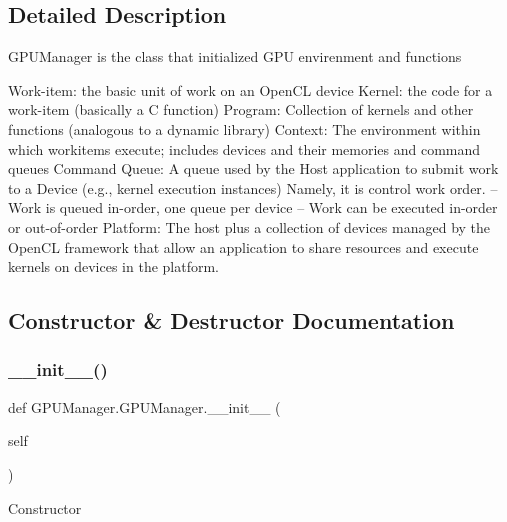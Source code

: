 \subsection{Detailed Description}
\begin{DoxyVerb}GPUManager is the class that initialized GPU envirenment and functions

Work-item: the basic unit of work on an OpenCL device
Kernel: the code for a work-item (basically a C function)
Program: Collection of kernels and other functions (analogous to a dynamic library)
Context: The environment within which workitems execute; includes devices and their memories and command queues
Command Queue: A queue used by the Host application to submit work to a Device (e.g., kernel execution instances)
                Namely, it is control work order.
   – Work is queued in-order, one queue per device
   – Work can be executed in-order or out-of-order
Platform: The host plus a collection of devices managed by the OpenCL framework that allow an application to share resources and execute kernels on devices in the platform.
\end{DoxyVerb}
 

\subsection{Constructor \& Destructor Documentation}
\mbox{\label{class_g_p_u_manager_1_1_g_p_u_manager_aaa00d0d2f90d9cb6bab88f873d3e1261}} 
\subsubsection{\texorpdfstring{\+\_\+\+\_\+init\+\_\+\+\_\+()}{\_\_init\_\_()}}
{\footnotesize\ttfamily def G\+P\+U\+Manager.\+G\+P\+U\+Manager.\+\_\+\+\_\+init\+\_\+\+\_\+ (\begin{DoxyParamCaption}\item[{}]{self }\end{DoxyParamCaption})}

\begin{DoxyVerb}Constructor
\end{DoxyVerb}
 

